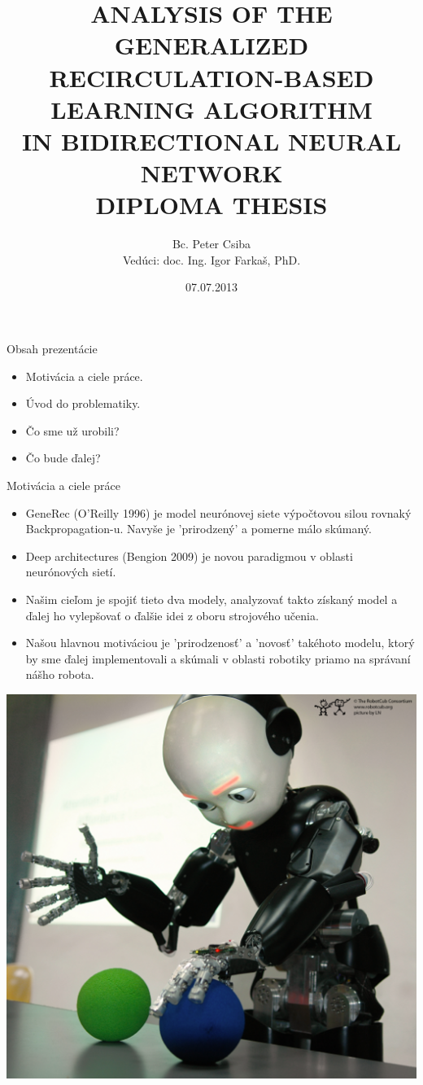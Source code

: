 \documentclass[xcolor=dvipsnames]{beamer}
\title[GeneRec Analysis]{
ANALYSIS OF THE GENERALIZED \\
RECIRCULATION-BASED LEARNING ALGORITHM \\
IN BIDIRECTIONAL NEURAL NETWORK \\
\vspace{3cm}
DIPLOMA THESIS
}
\author[P. Csiba]{Bc. Peter Csiba \\ Vedúci: doc. Ing. Igor Farkaš, PhD.}
\institute[FMFI UK]{
  UNIVERZITA KOMENSKÉHO V BRATISLAVE\\
  FAKULTA MATEMATIKY, FYZIKY A INFORMATIKY
}
\date{07.07.2013}
\begin{document}
\begin{frame}[plain]
  \titlepage
\end{frame}

\begin{frame}{Obsah prezentácie}
  \begin{itemize}
  \item Motivácia a ciele práce.  
  \item Úvod do problematiky. 
  \item Čo sme už urobili? 
  \item Čo bude ďalej?  
  \end{itemize} 
\end{frame}

\begin{frame}{Motivácia a ciele práce}
  \begin{itemize}
  \item GeneRec (O'Reilly 1996) je model neurónovej siete výpočtovou silou rovnaký Backpropagation-u. Navyše je 'prirodzený' 
  a pomerne málo skúmaný.   
  \item Deep architectures (Bengion 2009) je novou paradigmou v oblasti neurónových sietí. 
  \item Našim cieľom je spojiť tieto dva modely, analyzovať takto získaný model a ďalej ho vylepšovať o ďalšie idei z oboru strojového učenia. 
  \item Našou hlavnou motiváciou je 'prirodzenosť' a 'novosť' takéhoto modelu, ktorý by sme ďalej implementovali a skúmali v oblasti robotiky priamo na správaní nášho robota. 
  \end{itemize}
  \begin{center}
  \includegraphics{img/icub.png}
  \end{center} 
\end{frame}
\end{document}
